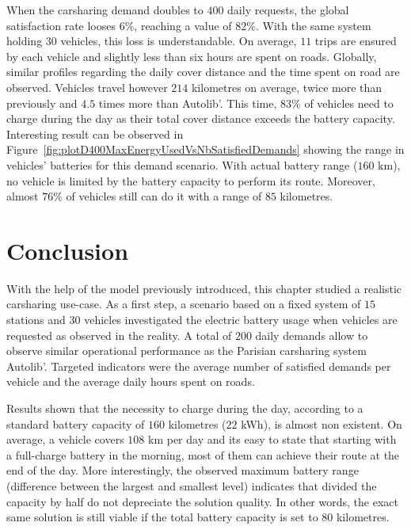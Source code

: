 \bigskip
When the carsharing demand doubles to $400$ daily requests, the global satisfaction rate looses $6$\%, reaching a value of $82$\%.
With the same system holding $30$ vehicles, this loss is understandable.
On average, $11$ trips are ensured by each vehicle and slightly less than six hours are spent on roads.
Globally, similar profiles regarding the daily cover distance and the time spent on road are observed.
Vehicles travel however $214$ kilometres on average, twice more than previously and $4.5$ times more than Autolib'.
This time, $83$\% of vehicles need to charge during the day as their total cover distance exceeds the battery capacity.
Interesting result can be observed in Figure~\ref{fig:plotD400MaxEnergyUsedVsNbSatisfiedDemands} showing the range in vehicles' batteries for this demand scenario.
With actual battery range ($160$ km), no vehicle is limited by the battery capacity to perform its route.
Moreover, almost $76$\% of vehicles still can do it with a range of $85$ kilometres.

%

\section{Conclusion} \label{sec:energyExp:conclusion}
With the help of the model {\ENERGY} previously introduced, this chapter studied a realistic carsharing use-case.
As a first step, a scenario based on a fixed system of $15$ stations and $30$ vehicles investigated the electric battery usage when vehicles are requested as observed in the reality.
A total of $200$ daily demands allow to observe similar operational performance as the Parisian carsharing system Autolib'.
Targeted indicators were the average number of satisfied demands per vehicle and the average daily hours spent on roads.

\medskip
Results shown that the necessity to charge during the day, according to a standard battery capacity of $160$ kilometres ($22$ kWh), is almost non existent.
On average, a vehicle covers $108$ km per day and its easy to state that starting with a full-charge battery in the morning, most of them can achieve their route at the end of the day.
More interestingly, the observed maximum battery range (difference between the largest and smallest level) indicates that divided the capacity by half do not depreciate the solution quality.
In other words, the exact same solution is still viable if the total battery capacity is set to $80$ kilometres.

